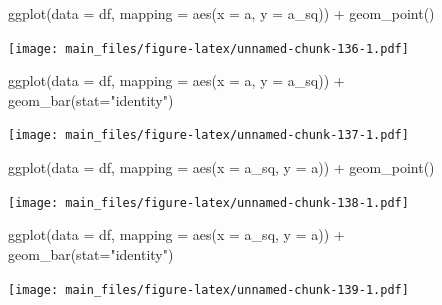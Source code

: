 \documentclass[
]{book}
\newenvironment{Shaded}{\begin{snugshade}}{\end{snugshade}}
\newcommand{\AttributeTok}[1]{\textcolor[rgb]{0.77,0.63,0.00}{#1}}
\newcommand{\FunctionTok}[1]{\textcolor[rgb]{0.00,0.00,0.00}{#1}}
\newcommand{\NormalTok}[1]{#1}
\newcommand{\SpecialCharTok}[1]{\textcolor[rgb]{0.00,0.00,0.00}{#1}}
\newcommand{\StringTok}[1]{\textcolor[rgb]{0.31,0.60,0.02}{#1}}
\begin{document}
\begin{Shaded}
\begin{Highlighting}[]
\FunctionTok{ggplot}\NormalTok{(}\AttributeTok{data =}\NormalTok{ df, }\AttributeTok{mapping =} \FunctionTok{aes}\NormalTok{(}\AttributeTok{x =}\NormalTok{ a, }\AttributeTok{y =}\NormalTok{ a\_sq)) }\SpecialCharTok{+} \FunctionTok{geom\_point}\NormalTok{()}
\end{Highlighting}
\end{Shaded}

\texttt{[image: main\_files/figure-latex/unnamed-chunk-136-1.pdf]}

\begin{Shaded}
\begin{Highlighting}[]
\FunctionTok{ggplot}\NormalTok{(}\AttributeTok{data =}\NormalTok{ df, }\AttributeTok{mapping =} \FunctionTok{aes}\NormalTok{(}\AttributeTok{x =}\NormalTok{ a, }\AttributeTok{y =}\NormalTok{ a\_sq)) }\SpecialCharTok{+} \FunctionTok{geom\_bar}\NormalTok{(}\AttributeTok{stat=}\StringTok{"identity"}\NormalTok{)}
\end{Highlighting}
\end{Shaded}

\texttt{[image: main\_files/figure-latex/unnamed-chunk-137-1.pdf]}

\begin{Shaded}
\begin{Highlighting}[]
\FunctionTok{ggplot}\NormalTok{(}\AttributeTok{data =}\NormalTok{ df, }\AttributeTok{mapping =} \FunctionTok{aes}\NormalTok{(}\AttributeTok{x =}\NormalTok{ a\_sq, }\AttributeTok{y =}\NormalTok{ a)) }\SpecialCharTok{+} \FunctionTok{geom\_point}\NormalTok{()}
\end{Highlighting}
\end{Shaded}

\texttt{[image: main\_files/figure-latex/unnamed-chunk-138-1.pdf]}

\begin{Shaded}
\begin{Highlighting}[]
\FunctionTok{ggplot}\NormalTok{(}\AttributeTok{data =}\NormalTok{ df, }\AttributeTok{mapping =} \FunctionTok{aes}\NormalTok{(}\AttributeTok{x =}\NormalTok{ a\_sq, }\AttributeTok{y =}\NormalTok{ a)) }\SpecialCharTok{+} \FunctionTok{geom\_bar}\NormalTok{(}\AttributeTok{stat=}\StringTok{"identity"}\NormalTok{)}
\end{Highlighting}
\end{Shaded}

\texttt{[image: main\_files/figure-latex/unnamed-chunk-139-1.pdf]}
\end{document}
